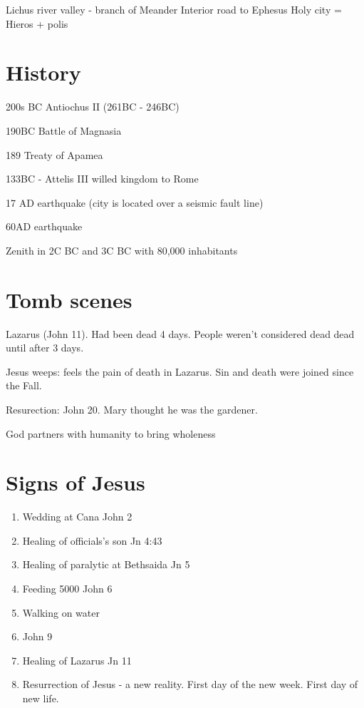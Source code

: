 \documentclass[
]{book}
\providecommand{\tightlist}{%
  \setlength{\itemsep}{0pt}\setlength{\parskip}{0pt}}
\begin{document}
Lichus river valley - branch of Meander
Interior road to Ephesus
Holy city = Hieros + polis

\hypertarget{history-2}{%
\section{History}\label{history-2}}

200s BC Antiochus II (261BC - 246BC)

190BC Battle of Magnasia

189 Treaty of Apamea

133BC - Attelis III willed kingdom to Rome

17 AD earthquake (city is located over a seismic fault line)

60AD earthquake

Zenith in 2C BC and 3C BC with 80,000 inhabitants

\hypertarget{tomb-scenes}{%
\section{Tomb scenes}\label{tomb-scenes}}

Lazarus (John 11). Had been dead 4 days. People weren't considered dead dead until after 3 days.

Jesus weeps: feels the pain of death in Lazarus. Sin and death were joined since the Fall.

Resurection: John 20. Mary thought he was the gardener.

God partners with humanity to bring wholeness

\hypertarget{signs-of-jesus}{%
\section{Signs of Jesus}\label{signs-of-jesus}}

\begin{enumerate}
\def\labelenumi{\arabic{enumi})}
\tightlist
\item
  Wedding at Cana John 2
\item
  Healing of officials's son Jn 4:43
\item
  Healing of paralytic at Bethsaida Jn 5
\item
  Feeding 5000 John 6
\item
  Walking on water
\item
  John 9
\item
  Healing of Lazarus Jn 11
\item
  Resurrection of Jesus - a new reality. First day of the new week. First day of new life.
\end{enumerate}
\end{document}
